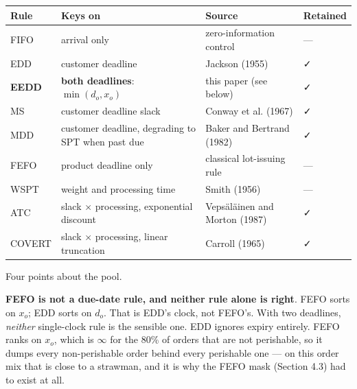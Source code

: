 \documentclass[review,3p,times]{elsarticle}
\newcounter{none}
\theoremstyle{definition}
\begin{document}
{\def\LTcaptype{none} %
\begin{longtable}[]{@{}
  >{\raggedright\arraybackslash}p{}
  >{\raggedright\arraybackslash}p{}
  >{\raggedright\arraybackslash}p{}
  >{\centering\arraybackslash}p{}@{}}
\toprule\noalign{}
\begin{minipage}[b]{\linewidth}\raggedright
Rule
\end{minipage} & \begin{minipage}[b]{\linewidth}\raggedright
Keys on
\end{minipage} & \begin{minipage}[b]{\linewidth}\raggedright
Source
\end{minipage} & \begin{minipage}[b]{\linewidth}\centering
Retained
\end{minipage} \\
\midrule\noalign{}
\endhead
\bottomrule\noalign{}
\endlastfoot
FIFO & arrival only & zero-information control & --- \\
EDD & customer deadline & Jackson (1955) & ✓ \\
\textbf{EEDD} & \textbf{both deadlines}: \(\min(d_o, x_o)\) & this paper
(see below) & ✓ \\
MS & customer deadline slack & Conway et al. (1967) & ✓ \\
MDD & customer deadline, degrading to SPT when past due & Baker and
Bertrand (1982) & ✓ \\
FEFO & product deadline only & classical lot-issuing rule & --- \\
WSPT & weight and processing time & Smith (1956) & --- \\
ATC & slack × processing, exponential discount & Vepsäläinen and Morton
(1987) & ✓ \\
COVERT & slack × processing, linear truncation & Carroll (1965) & ✓ \\
\end{longtable}
}

Four points about the pool.

\textbf{FEFO is not a due-date rule, and neither rule alone is right}.
FEFO sorts on \(x_o\); EDD sorts on \(d_o\). That is EDD's clock, not
FEFO's. With two deadlines, \emph{neither} single-clock rule is the
sensible one. EDD ignores expiry entirely. FEFO ranks on \(x_o\), which
is \(\infty\) for the 80\% of orders that are not perishable, so it
dumps every non-perishable order behind every perishable one --- on this
order mix that is close to a strawman, and it is why the FEFO mask
(Section 4.3) had to exist at all.
\end{document}
